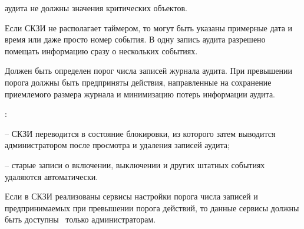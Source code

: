  аудита не должны  значения 
критических объектов.

\begin{note}
Если СКЗИ не располагает таймером, то могут быть указаны примерные дата и время
или даже просто номер события.
%
В одну запись аудита разрешено помещать информацию сразу о нескольких событиях. 
\end{note}


\label{R.AU.Over}
Должен быть определен порог числа записей журнала аудита.
При превышении порога должны быть предприняты действия,
направленные на сохранение приемлемого размера журнала
и минимизацию потерь информации аудита.

\begin{note}
:

-- СКЗИ переводится в состояние блокировки, из которого затем выводится
администратором после просмотра и удаления записей аудита;

-- старые записи о включении, выключении и других штатных событиях удаляются 
автоматически. 
\end{note}

\label{R.AU.Settings}
Если в СКЗИ реализованы сервисы настройки порога числа записей и 
предпринимаемых при превышении порога действий, то данные сервисы должны 
быть доступны~ только администраторам. 

